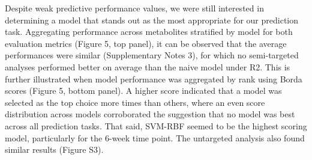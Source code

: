 Despite weak predictive performance values, we were still interested in determining a model that stands out as the most appropriate for our prediction task. Aggregating performance across metabolites stratified by model for both evaluation metrics (Figure 5, top panel), it can be observed that the average performances were similar (Supplementary Notes 3), for which no semi-targeted analyses performed better on average than the naive model under R2. This is further illustrated when model performance was aggregated by rank using Borda scores (Figure 5, bottom panel). A higher score indicated that a model was selected as the top choice more times than others, where an even score distribution across models corroborated the suggestion that no model was best across all prediction tasks. That said, SVM-RBF seemed to be the highest scoring model, particularly for the 6-week time point. The untargeted analysis also found similar results (Figure S3). 

